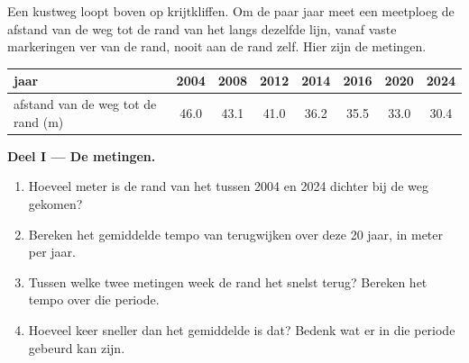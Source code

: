 \begin{problem}
\label{pb:g9:landforms:1}
Een kustweg loopt boven op krijtkliffen. Om de paar jaar meet een meetploeg
de afstand van de weg tot de rand van het  langs dezelfde lijn, vanaf
vaste markeringen ver van de rand, nooit aan de rand zelf. Hier zijn de
metingen.

\begin{center}
{\small
\begin{tabular}{|l|c|c|c|c|c|c|c|}
\hline
jaar & 2004 & 2008 & 2012 & 2014 & 2016 & 2020 & 2024 \\
\hline
afstand van de weg tot de rand (m) & 46.0 & 43.1 & 41.0 & 36.2 & 35.5 & 33.0 & 30.4 \\
\hline
\end{tabular}}
\end{center}

\noindent\textbf{Deel I --- De metingen.}\par\nopagebreak
\begin{enumerate}[beginpenalty=10000]
  \item Hoeveel meter is de rand van het  tussen 2004 en 2024 dichter
        bij de weg gekomen?
  \item Bereken het gemiddelde tempo van terugwijken over deze 20 jaar, in
        meter per jaar.
  \item Tussen welke twee metingen week de rand het snelst terug? Bereken
        het tempo over die periode.
  \item Hoeveel keer sneller dan het gemiddelde is dat? Bedenk wat er in die
        periode gebeurd kan zijn.
\end{enumerate}

\begin{omfigure}


\end{omfigure}
\end{problem}
